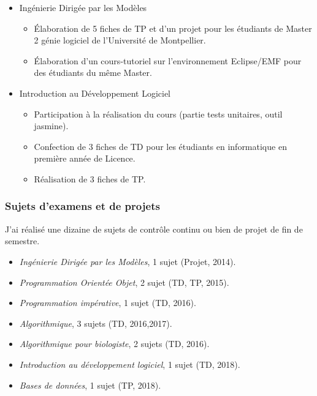 \begin{itemize}
\item Ingénierie Dirigée par les Modèles 
    \begin{itemize}
    \item Élaboration de 5 fiches de TP et d'un projet pour les étudiants de Master 2 génie logiciel de l'Université de Montpellier.
    \item Élaboration d'un cours-tutoriel sur l'environnement Eclipse/EMF pour des étudiants du même Master.
    \end{itemize}

\item Introduction au Développement Logiciel
    \begin{itemize}
        \item Participation à la réalisation du cours (partie tests unitaires, outil jasmine).
        \item Confection de 3 fiches de TD pour les étudiants en informatique en première année de Licence.
        \item Réalisation de 3 fiches de TP.
    \end{itemize}
\end{itemize}

\subsubsection*{Sujets d'examens et de projets}

J'ai réalisé une dizaine de sujets de contrôle continu ou bien de projet de fin de semestre.

\begin{itemize}
\item {\it Ingénierie Dirigée par les Modèles}, 1 sujet (Projet, 2014).

\item {\it Programmation Orientée Objet}, 2 sujet (TD, TP, 2015).

\item {\it Programmation impérative}, 1 sujet (TD, 2016).

\item {\it Algorithmique}, 3 sujets (TD, 2016,2017).

\item {\it Algorithmique pour biologiste}, 2 sujets (TD, 2016).

\item {\it Introduction au développement logiciel}, 1 sujet (TD, 2018).

\item {\it Bases de données}, 1 sujet (TP, 2018).
\end{itemize}

